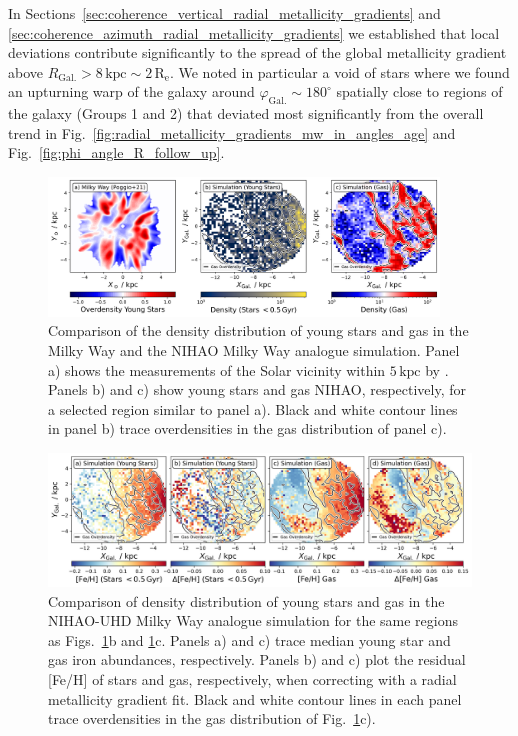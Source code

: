 \documentclass[twocolumn,apj,numberedappendix,appendixfloats,twocolappendix]{openjournal}
\begin{document}
\begin{CJK*}{UTF8}{gbsn}
In Sections~\ref{sec:coherence_vertical_radial_metallicity_gradients} and \ref{sec:coherence_azimuth_radial_metallicity_gradients} we established that local deviations contribute significantly to the spread of the global metallicity gradient above $R_\mathrm{Gal.} > 8\,\mathrm{kpc} \sim 2\,\mathrm{R_e}$. We noted in particular a void of stars where we found an upturning warp of the galaxy around $\varphi_\mathrm{Gal.} \sim 180^\circ$ spatially close to regions of the galaxy (Groups 1 and 2) that deviated most significantly from the overall trend in Fig.~\ref{fig:radial_metallicity_gradients_mw_in_angles_age} and Fig.~\ref{fig:phi_angle_R_follow_up}.


\begin{figure}
    \centering
    \includegraphics[width=0.925\textwidth]{figures/overdensities_mw_vs_nihao.png}
    \caption{Comparison of the density distribution of young stars and gas in the Milky Way and the NIHAO Milky Way analogue simulation. Panel a) shows the measurements of the Solar vicinity within $5\,\mathrm{kpc}$ by \citet{Poggio2021}. Panels b) and c) show young stars and gas NIHAO, respectively, for a selected region similar to panel a). Black and white contour lines in panel b) trace overdensities in the gas distribution of panel c).}
    \label{fig:overdensities_mw_vs_nihao}
\end{figure}

\begin{figure}
    \centering
    \includegraphics[width=\textwidth]{figures/nihao_gas_stars_density_overlay.png}
    \caption{Comparison of density distribution of young stars and gas in the NIHAO-UHD Milky Way analogue simulation for the same regions as Figs.~\ref{fig:overdensities_mw_vs_nihao}b and \ref{fig:overdensities_mw_vs_nihao}c. Panels a) and c) trace median young star and gas iron abundances, respectively. Panels b) and c) plot the residual [Fe/H] of stars and gas, respectively, when correcting with a radial metallicity gradient fit. Black and white contour lines in each panel trace overdensities in the gas distribution of Fig.~\ref{fig:overdensities_mw_vs_nihao}c).}
    \label{fig:nihao_gas_stars_density_overlay}
\end{figure}


\end{CJK*}
\end{document}
